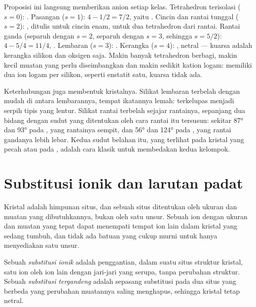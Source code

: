 Proposisi ini langsung memberikan anion setiap kelas. Tetrahedron terisolasi ($s = 0$): . Pasangan ($s = 1$): $4 - 1/2 = 7/2$, yaitu
. Cincin dan rantai tunggal ($s = 2$): , ditulis
 untuk cincin enam,  untuk dua tetrahedron dari
rantai. Rantai ganda (separuh dengan $s = 2$, separuh dengan $s = 3$, sehingga $s = 5/2$):
$4 - 5/4 = 11/4$, . Lembaran ($s = 3$): .
Kerangka ($s = 4$): , netral --- kuarsa adalah kerangka silikon dan oksigen saja. Makin banyak tetrahedron berbagi, makin kecil muatan yang perlu diseimbangkan dan makin sedikit kation logam:   memiliki dua ion logam per silikon,  seperti enstatit  satu, kuarsa tidak ada.

Keterhubungan juga membentuk kristalnya. Silikat lembaran terbelah dengan mudah di antara lembarannya, tempat ikatannya lemah:  terkelupas menjadi serpih tipis yang lentur. Silikat rantai terbelah sejajar rantainya, sepanjang dua bidang dengan sudut yang ditentukan oleh cara rantai itu tersusun: sekitar \ang{87} dan \ang{93} pada , yang rantainya sempit, dan \ang{56} dan \ang{124} pada , yang rantai gandanya lebih lebar. Kedua sudut belahan itu, yang terlihat pada kristal yang pecah atau pada , adalah cara klasik untuk membedakan kedua kelompok.

\section{Substitusi ionik dan larutan padat}

Kristal adalah himpunan situs, dan sebuah situs ditentukan oleh ukuran dan muatan yang dibutuhkannya, bukan oleh satu unsur. Sebuah ion dengan ukuran dan muatan yang tepat dapat menempati tempat ion lain dalam kristal yang sedang tumbuh, dan tidak ada batuan yang cukup murni untuk hanya menyediakan satu unsur.

\begin{definition}\label{def:b1:rock-forming-minerals:substitution}
Sebuah \emph{substitusi ionik} adalah penggantian, dalam suatu situs struktur kristal, satu ion oleh ion lain dengan jari-jari yang serupa, tanpa perubahan struktur. Sebuah \emph{substitusi tergandeng} adalah sepasang substitusi pada dua situs yang berbeda yang perubahan muatannya saling menghapus, sehingga kristal tetap netral.
\end{definition}

